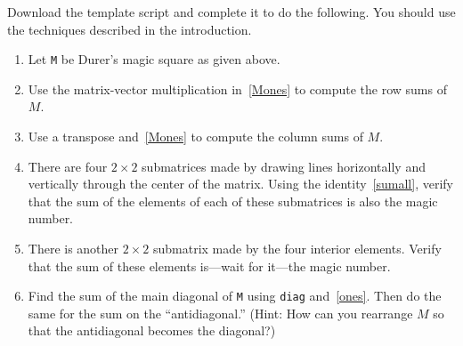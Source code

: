 \documentclass[11pt]{article}
\begin{document}
Download the template script and complete it to do the following. You should use the techniques described in the introduction. 

\begin{enumerate}
\item Let \texttt{M} be Durer's magic square as given above. 
\item Use the matrix-vector multiplication in~\eqref{Mones} to compute the row sums of $M$.  
\item Use a transpose and~\eqref{Mones} to compute the column sums of $M$. 
\item There are four $2\times 2$ submatrices made by drawing lines
  horizontally and vertically through the center of the matrix. Using the identity~\eqref{sumall}, verify that the sum of the elements of each of these submatrices is also the magic number.
\item There is another $2\times 2$ submatrix made by the four interior elements. Verify that the sum of these elements is---wait for it---the magic number. 
\item Find the sum of the main diagonal of \texttt{M} using \texttt{diag} and~\eqref{ones}. Then do the same for the sum on the ``antidiagonal.'' (Hint: How can you rearrange $M$ so that the antidiagonal becomes the diagonal?)
\end{enumerate}
\end{document}
